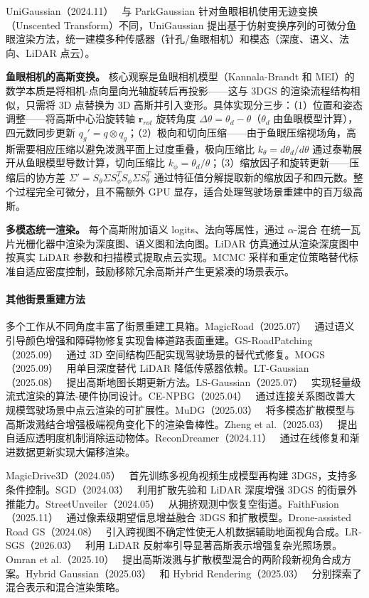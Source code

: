UniGaussian（2024.11）~\cite{2411_15355} 与 ParkGaussian 针对鱼眼相机使用无迹变换（Unscented Transform）不同，UniGaussian 提出基于仿射变换序列的可微分鱼眼渲染方法，统一建模多种传感器（针孔/鱼眼相机）和模态（深度、语义、法向、LiDAR 点云）。

\textbf{鱼眼相机的高斯变换。} 核心观察是鱼眼相机模型（Kannala-Brandt 和 MEI）的数学本质是将相机-点向量向光轴旋转后再投影——这与 3DGS 的渲染流程结构相似，只需将 3D 点替换为 3D 高斯并引入变形。具体实现分三步：（1）位置和姿态调整——将高斯中心沿旋转轴 $\mathbf{r}_{rot}$ 旋转角度 $\Delta\theta = \theta_d - \theta$（$\theta_d$ 由鱼眼模型计算），四元数同步更新 $q_g' = q \otimes q_g$；（2）极向和切向压缩——由于鱼眼压缩视场角，高斯需要相应压缩以避免泼溅平面上过度重叠，极向压缩比 $k_\theta = d\theta_d / d\theta$ 通过泰勒展开从鱼眼模型导数计算，切向压缩比 $k_\phi = \theta_d / \theta$；（3）缩放因子和旋转更新——压缩后的协方差 $\Sigma' = S_\theta \Sigma S_\phi^T S_\phi \Sigma S_\theta^T$ 通过特征值分解提取新的缩放因子和四元数。整个过程完全可微分，且不需额外 GPU 显存，适合处理驾驶场景重建中的百万级高斯。

\textbf{多模态统一渲染。} 每个高斯附加语义 logits、法向等属性，通过 $\alpha$-混合 在统一瓦片光栅化器中渲染为深度图、语义图和法向图。LiDAR 仿真通过从渲染深度图中按真实 LiDAR 参数和扫描模式提取点云实现。MCMC 采样和重定位策略替代标准自适应密度控制，鼓励移除冗余高斯并产生更紧凑的场景表示。

\paragraph{其他街景重建方法}

多个工作从不同角度丰富了街景重建工具箱。MagicRoad（2025.07）~\cite{2507_23340} 通过语义引导颜色增强和障碍物修复实现鲁棒道路表面重建。GS-RoadPatching（2025.09）~\cite{2509_19937} 通过 3D 空间结构匹配实现驾驶场景的替代式修复。MOGS（2025.09）~\cite{2509_06685} 用单目深度替代 LiDAR 降低传感器依赖。LT-Gaussian（2025.08）~\cite{2508_01704} 提出高斯地图长期更新方法。LS-Gaussian（2025.07）~\cite{2507_21572} 实现轻量级流式渲染的算法-硬件协同设计。CE-NPBG（2025.04）~\cite{2504_19557} 通过连接关系图改善大规模驾驶场景中点云渲染的可扩展性。MuDG（2025.03）~\cite{2503_10604} 将多模态扩散模型与高斯泼溅结合增强极端视角变化下的渲染鲁棒性。Zheng et al.（2025.03）~\cite{2503_12001} 提出自适应透明度机制消除运动物体。ReconDreamer（2024.11）~\cite{2411_19548} 通过在线修复和渐进数据更新实现大偏移渲染。

MagicDrive3D（2024.05）~\cite{2405_14475} 首先训练多视角视频生成模型再构建 3DGS，支持多条件控制。SGD（2024.03）~\cite{2403_20079} 利用扩散先验和 LiDAR 深度增强 3DGS 的街景外推能力。StreetUnveiler（2024.05）~\cite{2405_18416} 从拥挤观测中恢复空街道。FaithFusion（2025.11）~\cite{2511_21113} 通过像素级期望信息增益融合 3DGS 和扩散模型。Drone-assisted Road GS（2024.08）~\cite{2408_15242} 引入跨视图不确定性使无人机数据辅助地面视角合成。LR-SGS（2026.03）~\cite{2603_12647} 利用 LiDAR 反射率引导显著高斯表示增强复杂光照场景。Omran et al.（2025.10）~\cite{2510_12308} 提出高斯泼溅与扩散模型混合的两阶段新视角合成方案。Hybrid Gaussian（2025.03）~\cite{2503_08217} 和 Hybrid Rendering（2025.03）~\cite{2503_09464} 分别探索了混合表示和混合渲染策略。


